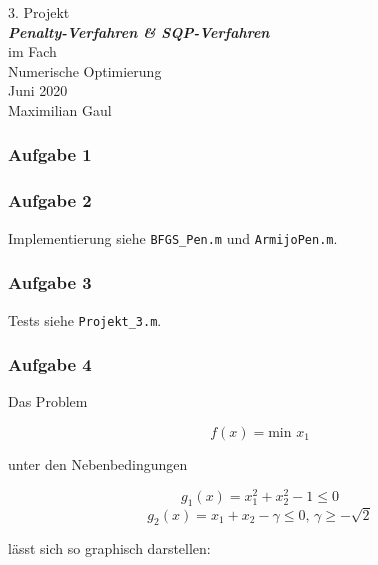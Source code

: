 \documentclass[a4paper, 12pt]{report}
\begin{document}
\begin{center}
    \vspace*{2em}
    \normalsize 3. Projekt\\
    \vspace*{1em}
    \normalsize \textbf{\textit{Penalty-Verfahren \& SQP-Verfahren}}\\
    \vspace*{4em}
    \normalsize im Fach\\
    \vspace*{1em}
    \large Numerische Optimierung\\
    \vspace*{30em}
    \normalsize Juni 2020\\
    \vspace*{1em}
    \normalsize Maximilian Gaul
\end{center}

\thispagestyle{empty}

\newpage

\subsubsection{Aufgabe 1}

\subsubsection{Aufgabe 2}
Implementierung siehe \lstinline[basicstyle=\ttfamily\color{black}]|BFGS_Pen.m| und
\lstinline[basicstyle=\ttfamily\color{black}]|ArmijoPen.m|.

\subsubsection{Aufgabe 3}
Tests siehe \lstinline[basicstyle=\ttfamily\color{black}]|Projekt_3.m|.

\subsubsection{Aufgabe 4}

Das Problem

$$f(x) = \text{min } x_1$$

unter den Nebenbedingungen

$$g_1(x) = x_1^2 + x_2^2 - 1 \leq 0$$
$$g_2(x) = x_1 + x_2 - \gamma \leq 0 \text{, } \gamma \geq -\sqrt{2}$$

lässt sich so graphisch darstellen:
\end{document}
